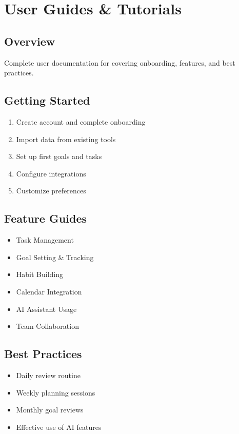 \chapter{User Guides \& Tutorials}
\label{ch:user-guides}

\section{Overview}
Complete user documentation for \lifeos{} covering onboarding, features, and best practices.

\section{Getting Started}
\begin{enumerate}
    \item Create account and complete onboarding
    \item Import data from existing tools
    \item Set up first goals and tasks
    \item Configure integrations
    \item Customize preferences
\end{enumerate}

\section{Feature Guides}
\begin{itemize}
    \item Task Management
    \item Goal Setting \& Tracking
    \item Habit Building
    \item Calendar Integration
    \item AI Assistant Usage
    \item Team Collaboration
\end{itemize}

\section{Best Practices}
\begin{itemize}
    \item Daily review routine
    \item Weekly planning sessions
    \item Monthly goal reviews
    \item Effective use of AI features
\end{itemize}
